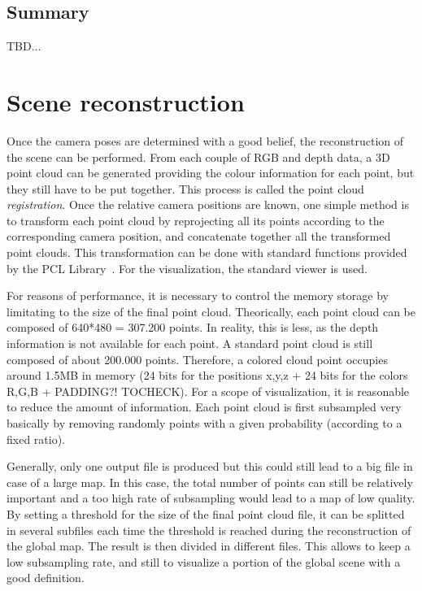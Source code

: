 \section{Summary}

TBD...

\clearpage

\chapter{Scene reconstruction}
\label{chap:reconstruction}

Once the camera poses are determined with a good belief, the reconstruction of the scene can be performed. From each couple of RGB and depth data, a 3D point cloud can be generated providing the colour information for each point, but they still have to be put together. This process is called the point cloud \emph{registration}. Once the relative camera positions are known, one simple method is to transform each point cloud by reprojecting all its points according to the corresponding camera position, and concatenate together all the transformed point clouds. This transformation can be done with standard functions provided by the PCL Library~\cite{Rusu_ICRA2011_PCL}. For the visualization, the standard viewer is used.

For reasons of performance, it is necessary to control the memory storage by limitating to the size of the final point cloud. Theorically, each point cloud can be composed of 640*480 = 307.200 points. In reality, this is less, as the depth information is not available for each point. A standard point cloud is still composed of about 200.000 points. Therefore, a colored cloud point occupies around 1.5MB in memory (24 bits for the positions x,y,z + 24 bits for the colors R,G,B + PADDING?! TOCHECK). For a scope of visualization, it is reasonable to reduce the amount of information. Each point cloud is first subsampled very basically by removing randomly points with a given probability (according to a fixed ratio).

Generally, only one output file is produced but this could still lead to a big file in case of a large map. In this case, the total number of points can still be relatively important and a too high rate of subsampling would lead to a map of low quality. By setting a threshold for the size of the final point cloud file, it can be splitted in several subfiles each time the threshold is reached during the reconstruction of the global map. The result is then divided in different files. This allows to keep a low subsampling rate, and still to visualize a portion of the global scene with a good definition.

